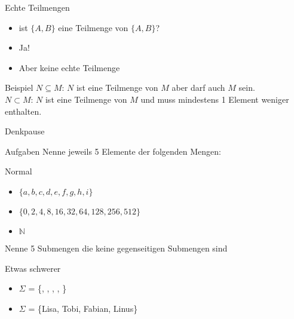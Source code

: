 \begin{frame}{Echte Teilmengen}
    \begin{itemize}
        \item ist $\{A,B\}$ eine Teilmenge von $\{A,B\}$?
        \pause
        \item \alert{Ja!}
        \pause
        \item Aber keine \alert{echte} Teilmenge
    \end{itemize}
    \pause
    \begin{exampleblock}{Beispiel}
                $N \subseteq M$: $N$ ist eine Teilmenge von $M$ aber darf auch $M$ sein.\\
                $N \subset M$: $N$ ist eine Teilmenge von $M$ und muss mindestens 1 Element weniger enthalten.
    \end{exampleblock}
\end{frame}

{
\begin{frame}[fragile]{Denkpause}
    \begin{alertblock}{Aufgaben}
    Nenne jeweils 5 Elemente der folgenden Mengen:
    \end{alertblock}
    
    \begin{block}{Normal}
        \begin{itemize}
            \item $\{a, b, c, d, e, f, g, h, i\}$
            \item $\{0, 2, 4, 8, 16, 32, 64, 128, 256, 512\}$
            \item $\mathbb N$
        \end{itemize}
    \end{block}
    Nenne 5 Submengen die keine gegenseitigen Submengen sind
    \begin{block}{Etwas schwerer}
        \begin{itemize}
            \item $\Sigma$ = \{\WashCotton, \NoWash, \IroningII, \Tumbler, \SpecialForty \}
            \item $\Sigma$ = \{Lisa, Tobi, Fabian, Linus\}
        \end{itemize}
    \end{block}
\end{frame}
}

